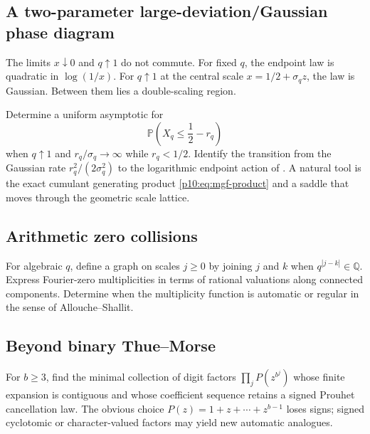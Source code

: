 \documentclass[11pt]{article}
\numberwithin{equation}{section}
\theoremstyle{definition}
\theoremstyle{remark}
\newcommand{\Q}{\mathbb Q}
\newcommand{\Prob}{\mathbb P}
\begin{document}
\subsection{A two-parameter large-deviation/Gaussian phase diagram}

The limits $x\downarrow0$ and $q\uparrow1$ do not commute.  For fixed $q$, the endpoint law is
quadratic in $\log(1/x)$.  For $q\uparrow1$ at the central scale
$x=1/2+\sigma_qz$, the law is Gaussian.  Between them lies a double-scaling region.

\begin{problem}
Determine a uniform asymptotic for
\[
 \Prob\!\left(X_q\le\frac12-r_q\right)
\]
when $q\uparrow1$ and $r_q/\sigma_q\to\infty$ while $r_q<1/2$.  Identify the transition from
the Gaussian rate $r_q^2/(2\sigma_q^2)$ to the logarithmic endpoint action of
.  A natural tool is the exact cumulant generating product
\eqref{p10:eq:mgf-product} and a saddle that moves through the geometric scale lattice.
\end{problem}

\subsection{Arithmetic zero collisions}

\begin{problem}
For algebraic $q$, define a graph on scales $j\ge0$ by joining $j$ and $k$ when
$q^{|j-k|}\in\Q$.  Express Fourier-zero multiplicities in terms of rational valuations along
connected components.  Determine when the multiplicity function is automatic or regular in
the sense of Allouche--Shallit.
\end{problem}

\subsection{Beyond binary Thue--Morse}

\begin{problem}
For $b\ge3$, find the minimal collection of digit factors
\(
 \prod_j P(z^{b^j})
\)
whose finite expansion is contiguous and whose coefficient sequence retains a signed
Prouhet cancellation law.  The obvious choice
$P(z)=1+z+\cdots+z^{b-1}$ loses signs; signed cyclotomic or character-valued factors may yield
new automatic analogues.
\end{problem}
\end{document}
